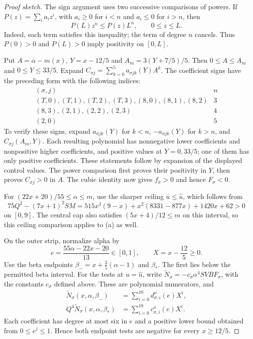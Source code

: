 \begin{proof}[Proof sketch]
The sign argument uses two successive comparisons of powers. If
$P(z)=\sum_i a_i z^i$, with $a_i\ge0$ for $i<n$ and $a_i\le0$
for $i>n$, then
\[
 P(L)z^n\le P(z)L^n,\qquad 0\le z\le L.
\]
Indeed, each term satisfies this inequality; the term of degree $n$
cancels. Thus $P(0)>0$ and $P(L)>0$ imply positivity on $[0,L]$.

Put $A=\alpha-m(x)$, $Y=x-12/5$ and $A_m=3(Y+7/5)/5$.
Then $0\le A\le A_m$ and $0\le Y\le33/5$. Expand
$C_{\sigma j}=\sum_{k=0}^5 a_{\sigma j k}(Y)A^k$.
The coefficient signs have the preceding form with the following indices:
\[
\begin{array}{c|c}
 (\sigma,j)&n\\\hline
 (T,0),(T,1),(T,2),(T,3),(8,0),(8,1),(8,2)&3\\
 (8,3),(2,1),(2,2),(2,3)&4\\
 (2,0)&5
\end{array}
\]
To verify these signs, expand $a_{\sigma j k}(Y)$ for $k<n$,
$-a_{\sigma j k}(Y)$ for $k>n$, and $C_{\sigma j}(A_m,Y)$.
Each resulting polynomial has nonnegative lower coefficients and
nonpositive higher coefficients, and positive values at $Y=0,33/5$;
one of them has only positive coefficients. These statements follow
by expansion of the displayed control values. The power comparison
first proves their positivity in $Y$, then proves $C_{\sigma j}>0$
in $A$. The cubic identity now gives $f_\sigma>0$ and hence $F_\sigma<0$.

For $(22x+20)/55\le\alpha\le m$, use the sharper ceiling
$\bar u\le\hat u$, which follows from
\[
 75Q^2-(7x+1)^2SM
 =515x^3(9-x)+x^2(8331-877x)+1420x+62>0
\]
on $[0,9]$. The central cap also satisfies $(5x+4)/12\le m$ on this interval,
so this ceiling comparison applies to (a) as well.

On the outer strip, normalize alpha by
\[
 e=\frac{55\alpha-22x-20}{13}\in[0,1],\qquad X=x-\frac{12}5\ge0.
\]
Use the beta endpoints $\beta_-=x+\frac35(\alpha-1)$ and $\beta_*$.
The first lies below the permitted beta interval. For the tests at $u=\hat u$,
write $\widetilde N_\sigma=-c_\sigma\alpha^4SVBF_\sigma$,
with the constants $c_\sigma$ defined above. These are polynomial numerators, and
\begin{align*}
 \widetilde N_\sigma(x,\alpha,\beta_-)
   &=\sum_{i=0}^{10}d^o_{\sigma,i}(e)X^i,\\
 Q^4\widetilde N_\sigma(x,\alpha,\beta_*)
   &=\sum_{i=0}^{18}c^o_{\sigma,i}(e)X^i.
\end{align*}
Each coefficient has degree at most six in $e$ and a positive lower bound
obtained from $0\le e^j\le1$. Hence both endpoint tests are negative for
every $x\ge12/5$.


\end{proof}
